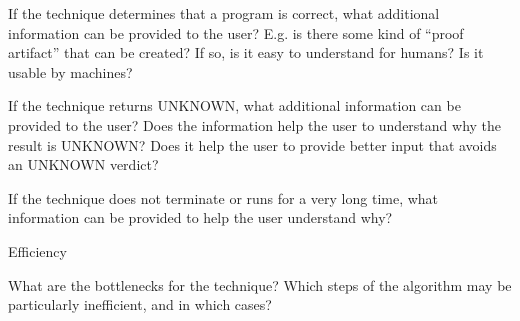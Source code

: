 \documentclass[a4paper]{article}
\begin{document}
\begin{minipage}[t]{0.16\linewidth}
\begin{betterlist}
\begin{betterlist}
			\item If the technique determines that a program is correct, what additional information can be provided to the user? E.g. is there some kind of \enquote{proof artifact} that can be created? If so, is it easy to understand for humans? Is it usable by machines?

			\item If the technique returns UNKNOWN, what additional information can be provided to the user? Does the information help the user to understand why the result is UNKNOWN? Does it help the user to provide better input that avoids an UNKNOWN verdict?

			\item If the technique does not terminate or runs for a very long time, what information can be provided to help the user understand why?

		\end{betterlist}
		\item \alert{Efficiency}
		\begin{betterlist}
			\item What are the bottlenecks for the technique? Which steps of the algorithm may be particularly inefficient, and in which cases?


\end{betterlist}
\end{betterlist}
\end{minipage}
\end{document}
